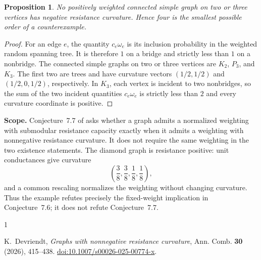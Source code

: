 \documentclass[11pt]{amsart}
\newtheorem{proposition}[theorem]{Proposition}
\begin{document}
\begin{proposition}
No positively weighted connected simple graph on two or three vertices has
negative resistance curvature. Hence four is the smallest possible order
of a counterexample.
\end{proposition}

\begin{proof}
For an edge $e$, the quantity $c_e\omega_e$ is its inclusion probability
in the weighted random spanning tree. It is therefore $1$ on a bridge and
strictly less than $1$ on a nonbridge. The connected simple graphs on two
or three vertices are $K_2$, $P_3$, and $K_3$. The first two are trees and
have curvature vectors $(1/2,1/2)$ and $(1/2,0,1/2)$, respectively. In
$K_3$, each vertex is incident to two nonbridges, so the sum of the two
incident quantities $c_e\omega_e$ is strictly less than $2$ and every
curvature coordinate is positive.
\end{proof}

\medskip
\noindent\textbf{Scope.}
Conjecture~7.7 of \cite{Devriendt} asks whether a graph admits a normalized
weighting with submodular resistance capacity exactly when it admits a
weighting with nonnegative resistance curvature. It does not require the
same weighting in the two existence statements. The diamond graph is
resistance positive: unit conductances give curvature
\[
\left(\frac38,\frac38,\frac18,\frac18\right),
\]
and a common rescaling normalizes the weighting without changing curvature.
Thus the example refutes precisely the fixed-weight implication in
Conjecture~7.6; it does not refute Conjecture~7.7.

\begin{thebibliography}{1}

K.~Devriendt,
\emph{Graphs with nonnegative resistance curvature},
Ann. Comb. \textbf{30} (2026), 415--438.
\href{https://doi.org/10.1007/s00026-025-00774-x}
{doi:10.1007/s00026-025-00774-x}.

\end{thebibliography}
\end{document}
